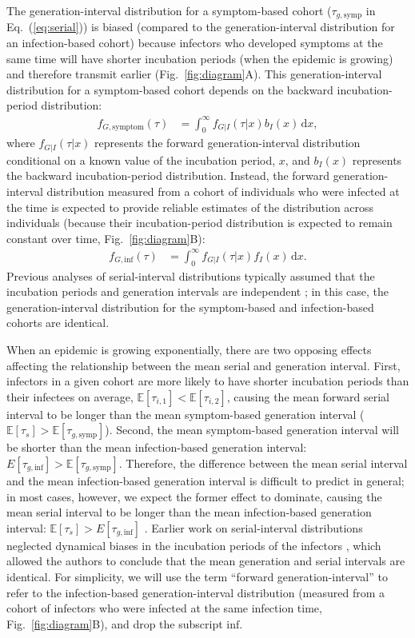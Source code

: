 \documentclass[12pt]{article}
\newcommand{\eref}[1]{Eq.~(\ref{eq:#1})}
\newcommand{\fref}[1]{Fig.~\ref{fig:#1}}
\newcommand{\dd}[1]{\ensuremath{\, \mathrm{d}#1}}
\newcommand{\dx}{\dd{x}}
\begin{document}
The generation-interval distribution for a symptom-based cohort ($\tau_{g, \mathrm{symp}}$ in \eref{serial}) is biased (compared to the generation-interval distribution for an infection-based cohort) because infectors who developed symptoms at the same time will have shorter incubation periods (when the epidemic is growing) and therefore transmit earlier (\fref{diagram}A).
This generation-interval distribution for a symptom-based cohort depends on the backward incubation-period distribution:
\begin{align}
f_{G, \mathrm{symptom}}(\tau) &= \int_0^\infty f_{G|I}(\tau|x) b_I(x) \dx,
\end{align}
where $f_{G|I}(\tau|x)$ represents the forward generation-interval distribution conditional on a known value of the incubation period, $x$, and $b_I(x)$ represents the backward incubation-period distribution.
Instead, the forward generation-interval distribution measured from a cohort of individuals who were infected at the time is expected to provide reliable estimates of the distribution across individuals (because their incubation-period distribution is expected to remain constant over time, \fref{diagram}B):
\begin{align}
f_{G, \mathrm{inf}}(\tau) &= \int_0^\infty f_{G|I}(\tau|x) f_I(x) \dx.
\label{eq:meangen}
\end{align}
Previous analyses of serial-interval distributions typically assumed that the incubation periods and generation intervals are independent \citep{ganyani2020estimating}; in this case, the generation-interval distribution for the symptom-based and infection-based cohorts are identical.

When an epidemic is growing exponentially, there are two opposing effects affecting the relationship between the mean serial and generation interval.
First, infectors in a given cohort are more likely to have shorter incubation periods than their infectees on average, $\mathbb E[\tau_{i, 1}] < \mathbb E[\tau_{i, 2}]$, causing the mean forward serial interval to be longer than the mean symptom-based generation interval ($\mathbb E[\tau_s] > \mathbb E[\tau_{g, \mathrm{symp}}]$).
Second, the mean symptom-based generation interval will be shorter than the mean infection-based generation interval: $E[\tau_{g, \mathrm{inf}}] > \mathbb E[\tau_{g, \mathrm{symp}}]$.
Therefore, the difference between the mean serial interval and the mean infection-based generation interval is difficult to predict in general; in most cases, however, we expect the former effect to dominate, causing the mean serial interval to be longer than the mean infection-based generation interval: $\mathbb E[\tau_s] > E[\tau_{g, \mathrm{inf}}]$ \citep{park2021forward}.
Earlier work on serial-interval distributions neglected dynamical biases in the incubation periods of the infectors \citep{svensson2007note,britton2019estimation}, which allowed the authors to conclude that the mean generation and serial intervals are identical.
For simplicity, we will use the term ``forward generation-interval'' to refer to the infection-based generation-interval distribution (measured from a cohort of infectors who were infected at the same infection time, \fref{diagram}B), and drop the subscript $\mathrm{inf}$.
\end{document}
